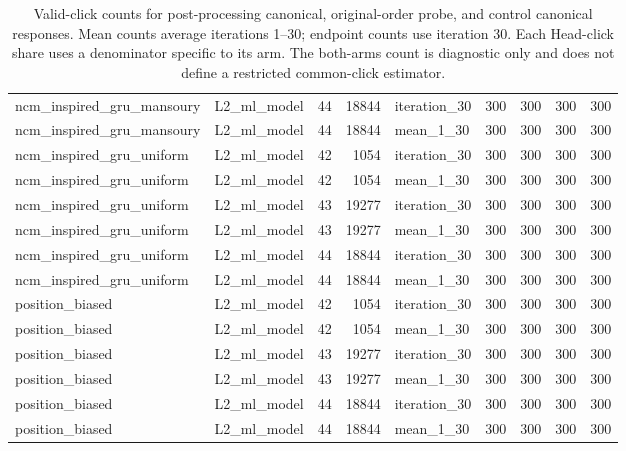 \begin{table}[htbp!]
\begin{tabular}{llrrlrrrr}
ncm\_inspired\_gru\_mansoury & L2\_ml\_model & 44 & 18844 & iteration\_30 & 300 & 300 & 300 & 300 \\
ncm\_inspired\_gru\_mansoury & L2\_ml\_model & 44 & 18844 & mean\_1\_30 & 300 & 300 & 300 & 300 \\
ncm\_inspired\_gru\_uniform & L2\_ml\_model & 42 & 1054 & iteration\_30 & 300 & 300 & 300 & 300 \\
ncm\_inspired\_gru\_uniform & L2\_ml\_model & 42 & 1054 & mean\_1\_30 & 300 & 300 & 300 & 300 \\
ncm\_inspired\_gru\_uniform & L2\_ml\_model & 43 & 19277 & iteration\_30 & 300 & 300 & 300 & 300 \\
ncm\_inspired\_gru\_uniform & L2\_ml\_model & 43 & 19277 & mean\_1\_30 & 300 & 300 & 300 & 300 \\
ncm\_inspired\_gru\_uniform & L2\_ml\_model & 44 & 18844 & iteration\_30 & 300 & 300 & 300 & 300 \\
ncm\_inspired\_gru\_uniform & L2\_ml\_model & 44 & 18844 & mean\_1\_30 & 300 & 300 & 300 & 300 \\
position\_biased & L2\_ml\_model & 42 & 1054 & iteration\_30 & 300 & 300 & 300 & 300 \\
position\_biased & L2\_ml\_model & 42 & 1054 & mean\_1\_30 & 300 & 300 & 300 & 300 \\
position\_biased & L2\_ml\_model & 43 & 19277 & iteration\_30 & 300 & 300 & 300 & 300 \\
position\_biased & L2\_ml\_model & 43 & 19277 & mean\_1\_30 & 300 & 300 & 300 & 300 \\
position\_biased & L2\_ml\_model & 44 & 18844 & iteration\_30 & 300 & 300 & 300 & 300 \\
position\_biased & L2\_ml\_model & 44 & 18844 & mean\_1\_30 & 300 & 300 & 300 & 300 \\
\hline
\end{tabular}
\caption{Valid-click counts for post-processing canonical, original-order probe, and control canonical responses. Mean counts average iterations 1--30; endpoint counts use iteration 30. Each Head-click share uses a denominator specific to its arm. The both-arms count is diagnostic only and does not define a restricted common-click estimator.}
\label{chap:results:tab:rq4_post_processing_click_denominators}
\end{table}
